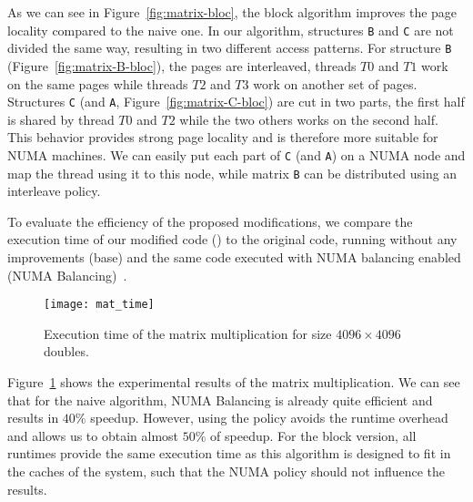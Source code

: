 
As we can see in Figure~\ref{fig:matrix-bloc}, the block algorithm improves the page
locality compared to the naive one. In our algorithm, structures \texttt{B}
and \texttt{C} are not divided the same way, resulting in two different access patterns. For structure \texttt{B} (Figure~\ref{fig:matrix-B-bloc}), the pages
are interleaved, threads $T0$ and $T1$ work on the same pages while threads
$T2$ and $T3$ work on another set of pages. Structures \texttt{C} (and
\texttt{A}, Figure~\ref{fig:matrix-C-bloc}) are cut in two parts, the first half
is shared by thread $T0$ and $T2$ while the two others works on the second
half. This behavior provides strong page locality and is therefore more
suitable for NUMA machines. We can easily put each part of \texttt{C} (and
\texttt{A}) on a NUMA node and map the thread using it to this node, while matrix
\texttt{B} can be distributed using an interleave policy.

To evaluate the efficiency of the proposed modifications, we compare the execution
time of our modified code (\TABARNAC) to the original code, running without any
improvements (base) and the same code executed with NUMA balancing enabled
(NUMA Balancing)~\cite{Corbet}.

\begin{figure}[htb]
    \centering
    \texttt{[image: mat\_time]}
    \caption{Execution time of the matrix multiplication for size $4096\times 4096$ doubles.}
    \label{fig:matrix-res}
\end{figure}

Figure~\ref{fig:matrix-res} shows the experimental results of the matrix multiplication. We can see that for
the naive algorithm, NUMA Balancing is already quite efficient and results in $40\%$
speedup. However, using the \TABARNAC policy avoids the runtime overhead and
allows us to obtain almost $50\%$ of speedup. For the block version, all runtimes
provide the same execution time as this algorithm is designed to fit in the
caches of the system, such that the NUMA policy should not influence the results.


